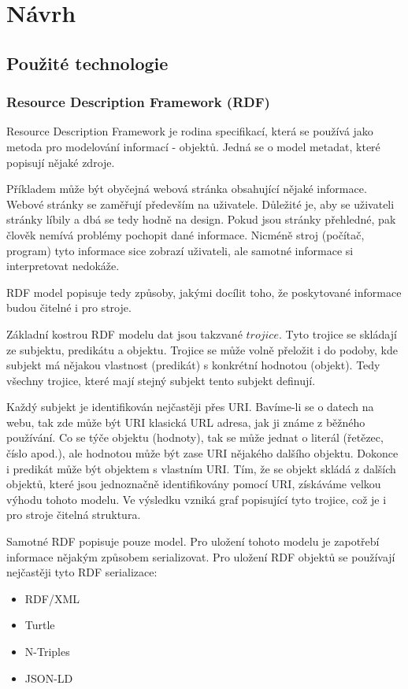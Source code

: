 \documentclass[thesis=B,czech]{FITthesis}[2012/06/26]
\begin{document}
 \chapter{Návrh}
 
 \section{Použité technologie}
 
 \subsection{Resource Description Framework (RDF)}
 Resource Description Framework je rodina specifikací, která se používá jako metoda pro modelování informací - objektů.
 Jedná se o model metadat, které popisují nějaké zdroje.
 
 Příkladem může být obyčejná webová stránka obsahující nějaké informace. Webové stránky se zaměřují především na uživatele.
 Důležité je, aby se uživateli stránky líbily a dbá se tedy hodně na design. Pokud jsou stránky přehledné, pak člověk nemívá problémy pochopit
 dané informace. Nicméně stroj (počítač, program) tyto informace sice zobrazí uživateli, ale samotné informace si interpretovat nedokáže.
 
 RDF model popisuje tedy způsoby, jakými docílit toho, že poskytované informace budou čitelné i pro stroje.
 
 Základní kostrou RDF modelu dat jsou takzvané $trojice$. Tyto trojice se skládají ze subjektu, predikátu a objektu.
 Trojice se může volně přeložit i do podoby, kde subjekt má nějakou vlastnost (predikát) s konkrétní hodnotou (objekt). Tedy všechny trojice, které mají
 stejný subjekt tento subjekt definují.
 
 Každý subjekt je identifikován nejčastěji přes URI. Bavíme-li se o datech na webu, tak zde může být URI klasická URL adresa, jak ji známe
 z běžného používání. Co se týče objektu (hodnoty), tak se může jednat o literál (řetězec, číslo apod.), ale hodnotou může být zase URI nějakého dalšího objektu.
 Dokonce i predikát může být objektem s vlastním URI. Tím, že se objekt skládá z dalších objektů, které jsou jednoznačně identifikovány pomocí URI, získáváme velkou výhodu
 tohoto modelu. Ve výsledku vzniká graf popisující tyto trojice, což je i pro stroje čitelná struktura.
 
 Samotné RDF popisuje pouze model. Pro uložení tohoto modelu je zapotřebí informace nějakým způsobem serializovat. Pro uložení RDF objektů se 
 používají nejčastěji tyto RDF serializace:
 \begin{itemize}
  \item RDF/XML
  \item Turtle
  \item N-Triples
  \item JSON-LD
 \end{itemize}
 
\end{document}
